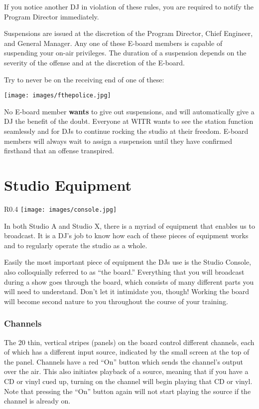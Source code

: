 \documentclass{witrman}
\begin{document}
If you notice another DJ in violation of these rules, you are required to notify
the Program Director immediately.

Suspensions are issued at the discretion of the Program Director, Chief
Engineer, and General Manager.  Any one of these E-board members is capable of
suspending your on-air privileges.  The duration of a suspension depends on the
severity of the offense and at the discretion of the E-board.

Try to never be on the receiving end of one of these:

\begin{center}
    \texttt{[image: images/fthepolice.jpg]}
\end{center}

No E-board member \textbf{wants} to give out suspensions, and will automatically
give a DJ the benefit of the doubt.  Everyone at WITR wants to see the station
function seamlessly and for DJs to continue rocking the studio at their freedom.
E-board members will always wait to assign a suspension until they have
confirmed firsthand that an offense transpired.


\chapter{Studio Equipment}

\begin{wrapfigure}{R}{0.4\linewidth}
    \centering
    \texttt{[image: images/console.jpg]}
\end{wrapfigure}

In both Studio A and Studio X, there is a myriad of equipment that enables us to
broadcast.  It is a DJ's job to know how each of these pieces of equipment works
and to regularly operate the studio as a whole.

Easily the most important piece of equipment the DJs use is the Studio Console,
also colloquially referred to as ``the board.''  Everything that you will
broadcast during a show goes through the board, which consists of many different
parts you will need to understand.  Don't let it intimidate you, though!
Working the board will become second nature to you throughout the course of your
training.

\subsection{Channels}

The 20 thin, vertical stripes (panels) on the board control different channels,
each of which has a different input source, indicated by the small screen at the
top of the panel.  Channels have a red ``On'' button which sends the channel's
output over the air.  This also initiates playback of a source, meaning that if
you have a CD or vinyl cued up, turning on the channel will begin playing that
CD or vinyl.  Note that pressing the ``On'' button again will not start playing
the source if the channel is already on.
\end{document}
